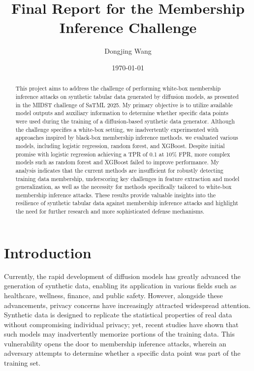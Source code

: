 \documentclass[12pt]{article}
\title{\textbf{Final Report for the Membership Inference Challenge}}
\author{Dongjing Wang}
\date{\today}
\begin{document}
\maketitle

\begin{abstract}
\noindent
This project aims to address the challenge of performing white-box membership inference attacks on synthetic tabular data generated by diffusion models, as presented in the MIDST challenge of SaTML 2025. My primary objective is to utilize available model outputs and auxiliary information to determine whether specific data points were used during the training of a diffusion-based synthetic data generator. Although the challenge specifies a white-box setting, we inadvertently experimented with approaches inspired by black-box membership inference methods. we evaluated various models, including logistic regression, random forest, and XGBoost. Despite initial promise with logistic regression achieving a TPR of 0.1 at 10\% FPR, more complex models such as random forest and XGBoost failed to improve performance. My analysis indicates that the current methods are insufficient for robustly detecting training data membership, underscoring key challenges in feature extraction and model generalization, as well as the necessity for methods specifically tailored to white-box membership inference attacks. These results provide valuable insights into the resilience of synthetic tabular data against membership inference attacks and highlight the need for further research and more sophisticated defense mechanisms.

\end{abstract}

\section{Introduction}
\label{sec:intro}
Currently, the rapid development of diffusion models has greatly advanced the generation of synthetic data, enabling its application in various fields such as healthcare, wellness, finance, and public safety. However, alongside these advancements, privacy concerns have increasingly attracted widespread attention. Synthetic data is designed to replicate the statistical properties of real data without compromising individual privacy; yet, recent studies have shown that such models may inadvertently memorize portions of the training data. This vulnerability opens the door to membership inference attacks, wherein an adversary attempts to determine whether a specific data point was part of the training set.
\end{document}

